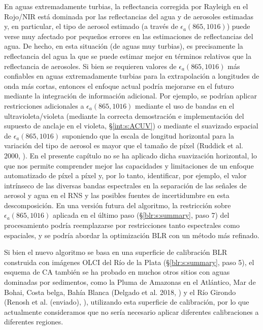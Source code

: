     En aguas extremadamente turbias, la reflectancia corregida por Rayleigh en el Rojo/NIR está dominada por las reflectancias del agua y de aerosoles estimadas y, en particular, el tipo de aerosol estimado (a través de $\epsilon_{a}(865,1016)$) puede verse muy afectado por pequeños errores en las estimaciones de reflectancias del agua. De hecho, en esta situación (de aguas muy turbias), es precisamente la reflectancia del agua la que se puede estimar mejor en términos relativos que la reflectancia de aerosoles. Si bien se requieren valores de $\epsilon_{a}(865,1016)$ más confiables en aguas extremadamente turbias para la extrapolación a longitudes de onda más cortas, entonces el enfoque actual podría mejorarse en el futuro mediante la integración de información adicional. Por ejemplo, se podrían aplicar restricciones adicionales a $\epsilon_{a}(865,1016)$ mediante el uso de bandas en el ultravioleta/violeta (mediante la correcta demostración e implementación del supuesto de anclaje en el violeta, \S \ref{int:s:ACUV}) o mediante el suavizado espacial de $\epsilon_{a}(865,1016)$ suponiendo que la escala de longitud horizontal para la variación del tipo de aerosol es mayor que el tamaño de píxel (Ruddick et al. 2000, \cite{ruddick2000}). En el presente capítulo no se ha aplicado dicha suavización horizontal, lo que nos permite comprender mejor las capacidades y limitaciones de un enfoque automatizado de píxel a píxel y, por lo tanto, identificar, por ejemplo, el valor intrínseco de las diversas bandas espectrales en la separación de las señales de aerosol y agua en el RNS y las posibles fuentes de incertidumbre en esta descomposición. En una versión futura del algoritmo, la restricción sobre $\epsilon_{a}(865,1016)$ aplicada en el último paso (\S \ref{blr:s:summary}, paso 7) del procesamiento podría reemplazarse por restricciones tanto espectrales como espaciales, y se podría abordar la optimización BLR con un método más refinado.
    
    Si bien el nuevo algoritmo se basa en una superficie de calibración BLR construida con imágenes OLCI del Río de la Plata (\S \ref{blr:s:summary}, paso 5), el esquema de CA también se ha probado en muchos otros sitios con aguas dominadas por sedimentos, como la Pluma de Amazonas en el Atlántico, Mar de Bohai, Costa belga, Bahía Blanca (Delgado et al. 2018, \cite{delgado2018}) y el Río Girondo (Renosh et al. (enviado), \cite{renosh2019}), utilizando esta superficie de calibración, por lo que actualmente consideramos que no sería necesario aplicar diferentes calibraciones a diferentes regiones.

